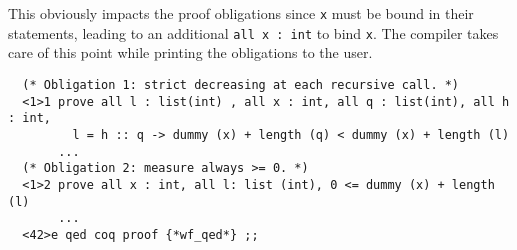 This obviously impacts the proof obligations since {\tt x} must be
bound in their statements, leading to an additional
\lstinline"all x : int" to bind {\tt x}. The compiler takes care of
this point while printing the obligations to the user.

\noindent
{\scriptsize
\begin{lstlisting}
  (* Obligation 1: strict decreasing at each recursive call. *)
  <1>1 prove all l : list(int) , all x : int, all q : list(int), all h : int,
         l = h :: q -> dummy (x) + length (q) < dummy (x) + length (l)
       ...
  (* Obligation 2: measure always >= 0. *)
  <1>2 prove all x : int, all l: list (int), 0 <= dummy (x) + length (l)
       ...
  <42>e qed coq proof {*wf_qed*} ;;
\end{lstlisting}
}
